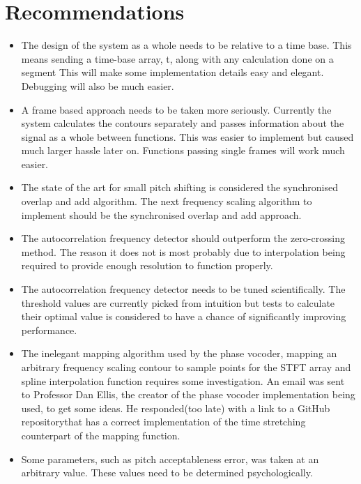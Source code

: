 \newpage

\section{Recommendations}

\begin{itemize}

\item
The design of the system as a whole needs to be relative to a time base.
This means sending a time-base array, t, along with any calculation done on a
segment This will make some implementation details easy and elegant. Debugging
will also be much easier.

\item
A frame based approach needs to be taken more seriously. Currently the
system calculates the contours separately and passes information about the signal
as a whole between functions. This was easier to implement but caused much larger
hassle later on. Functions passing single frames will work much easier.

\item
The state of the art for small pitch shifting is considered the synchronised
overlap and add algorithm. The next frequency scaling algorithm to implement
should be the synchronised overlap and add approach.

\item
The autocorrelation frequency detector should outperform the zero-crossing
method. The reason it does not is most probably due to interpolation being
required to provide enough resolution to function properly.

\item
The autocorrelation frequency detector needs to be tuned scientifically. The
threshold values are currently picked from intuition but tests to calculate their
optimal value is considered to have a chance of significantly improving
performance.

\item
The inelegant mapping algorithm used by the phase vocoder, mapping an
arbitrary frequency scaling contour to sample points for the STFT array and spline
interpolation function requires some investigation. An email was sent to Professor
Dan Ellis, the creator of the phase vocoder implementation being used, to get some
ideas. He responded(too late) with a link to a GitHub
repository\footnotemark\space that has a correct implementation of the time
stretching counterpart of the mapping function.


\item
Some parameters, such as pitch acceptableness error, was taken at an
arbitrary value. These values need to be determined psychologically.

\end{itemize}
